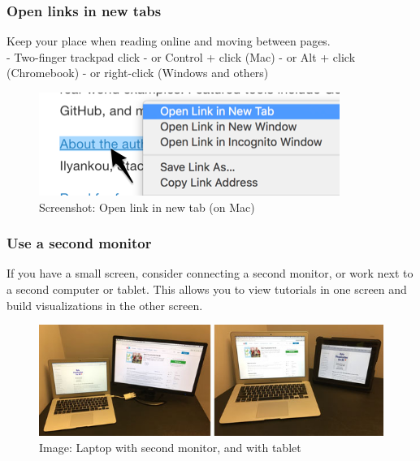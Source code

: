 \documentclass[
  english,
]{book}
\begin{document}
\hypertarget{open-links-in-new-tabs}{%
\subsubsection*{Open links in new tabs}\label{open-links-in-new-tabs}}

Keep your place when reading online and moving between pages.\\
- Two-finger trackpad click
- or Control + click (Mac)
- or Alt + click (Chromebook)
- or right-click (Windows and others)

\begin{figure}
\centering
\includegraphics{images/0-introduction/contextual-menu.png}
\caption{Screenshot: Open link in new tab (on Mac)}
\end{figure}

\hypertarget{use-a-second-monitor}{%
\subsubsection*{Use a second monitor}\label{use-a-second-monitor}}

If you have a small screen, consider connecting a second monitor, or work next to a second computer or tablet. This allows you to view tutorials in one screen and build visualizations in the other screen.

\begin{figure}
\centering
\includegraphics{images/0-introduction/laptop-and-monitor-and-tablet.jpg}
\caption{Image: Laptop with second monitor, and with tablet}
\end{figure}
\end{document}
